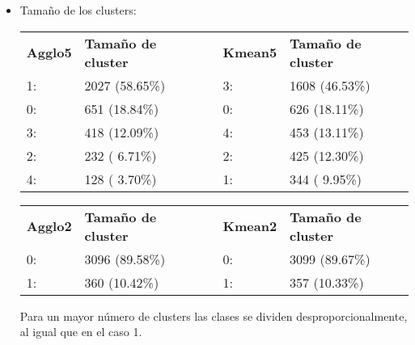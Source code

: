 \begin{itemize}
	\item Tamaño de los clusters:
	
	\begin{table}[H]
			\centering
			\begin{tabular}{|l|l|l|l|l|}
				\cline{1-2} \cline{4-5}
				\textbf{Agglo5} & \textbf{Tamaño de cluster} & \multirow{6}{*}{} & \textbf{Kmean5} & \textbf{Tamaño de cluster} \\ \cline{1-2} \cline{4-5} 
				1:              & 2027 (58.65\%)             &                   & 3:              & 1608 (46.53\%)             \\ \cline{1-2} \cline{4-5} 
				0:              & 651 (18.84\%)              &                   & 0:              & 626 (18.11\%)              \\ \cline{1-2} \cline{4-5} 
				3:              & 418 (12.09\%)              &                   & 4:              & 453 (13.11\%)              \\ \cline{1-2} \cline{4-5} 
				2:              & 232 ( 6.71\%)              &                   & 2:              & 425 (12.30\%)              \\ \cline{1-2} \cline{4-5} 
				4:              & 128 ( 3.70\%)              &                   & 1:              & 344 ( 9.95\%)              \\ \cline{1-2} \cline{4-5} 
			\end{tabular}%
		
	\end{table}

	
	
	\begin{table}[H]
		\centering
			\begin{tabular}{|l|l|l|l|l|}
				\cline{1-2} \cline{4-5}
				\textbf{Agglo2} & \textbf{Tamaño de cluster} &  & \textbf{Kmean2} & \textbf{Tamaño de cluster} \\ \cline{1-2} \cline{4-5} 
				0:              & 3096 (89.58\%)             &  & 0:              & 3099 (89.67\%)             \\ \cline{1-2} \cline{4-5} 
				1:              & 360 (10.42\%)              &  & 1:              & 357 (10.33\%)              \\ \cline{1-2} \cline{4-5} 
			\end{tabular}%
		
	\end{table}
	
	Para un mayor número de clusters las clases se dividen desproporcionalmente, al igual que en el caso 1.
	

\end{itemize}

